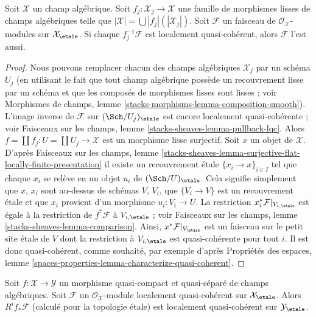 \begin{lemma}
\label{lemma-check-lqc-on-etale-covering}
Soit $\mathcal{X}$ un champ algébrique. Soit
$f_j : \mathcal{X}_j \to \mathcal{X}$ une famille de morphismes
lisses de champs algébriques telle que
$|\mathcal{X}| =\bigcup |f_j|(|\mathcal{X}_j|)$.
Soit $\mathcal{F}$ un faisceau de $\mathcal{O}_\mathcal{X}$-modules
sur $\mathcal{X}_\etale$. Si chaque $f_j^{-1}\mathcal{F}$
est localement quasi-cohérent, alors $\mathcal{F}$ l'est aussi.
\end{lemma}

\begin{proof}
Nous pouvons remplacer chacun des champs algébriques $\mathcal{X}_j$ par
un schéma $U_j$ (en utilisant le fait que tout champ algébrique possède un recouvrement lisse par
un schéma et que les composés de morphismes lisses sont lisses ; voir
Morphismes de champs, lemme \ref{stacks-morphisms-lemma-composition-smooth}).
L'image inverse de $\mathcal{F}$ sur $(\Sch/U_j)_\etale$ est encore
localement quasi-cohérente ; voir
Faisceaux sur les champs, lemme \ref{stacks-sheaves-lemma-pullback-lqc}.
Alors $f = \coprod f_j : U = \coprod U_j \to \mathcal{X}$ est un morphisme
lisse surjectif. Soit $x$ un objet de $\mathcal{X}$. D'après
Faisceaux sur les champs, lemme
\ref{stacks-sheaves-lemma-surjective-flat-locally-finite-presentation}
il existe un recouvrement étale $\{x_i \to x\}_{i \in I}$
tel que chaque $x_i$ se relève en un objet $u_i$ de $(\Sch/U)_\etale$.
Cela signifie simplement que $x$, $x_i$ sont au-dessus de schémas $V$, $V_i$, que
$\{V_i \to V\}$ est un recouvrement étale et que $x_i$ provient
d'un morphisme $u_i : V_i \to U$. La restriction
$x_i^*\mathcal{F}|_{V_{i, \etale}}$ est égale à la restriction
de $f^*\mathcal{F}$ à $V_{i, \etale}$ ; voir
Faisceaux sur les champs, lemme \ref{stacks-sheaves-lemma-comparison}.
Ainsi, $x^*\mathcal{F}|_{V_\etale}$
est un faisceau sur le petit site étale de $V$ dont la restriction
à $V_{i, \etale}$ est quasi-cohérente pour tout $i$.
Il est donc quasi-cohérent, comme souhaité, par exemple d'après
Propriétés des espaces, lemme
\ref{spaces-properties-lemma-characterize-quasi-coherent}.
\end{proof}

\begin{lemma}
\label{lemma-pushforward-locally-quasi-coherent}
Soit $f : \mathcal{X} \to \mathcal{Y}$ un morphisme quasi-compact et
quasi-séparé de champs algébriques. Soit
$\mathcal{F}$ un $\mathcal{O}_\mathcal{X}$-module localement quasi-cohérent
sur $\mathcal{X}_\etale$.
Alors $R^if_*\mathcal{F}$ (calculé pour la topologie étale) est
localement quasi-cohérent sur $\mathcal{Y}_\etale$.
\end{lemma}


